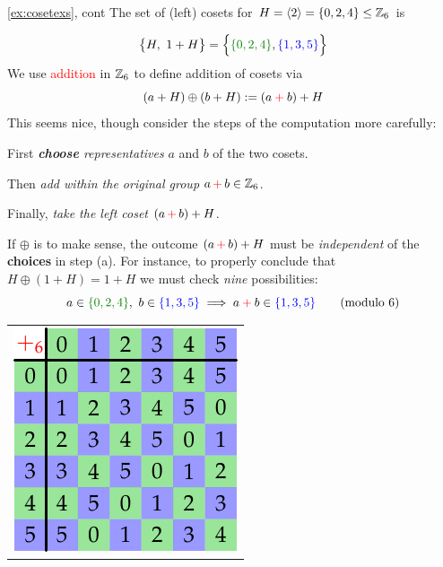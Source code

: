 \begin{examples*}{\ref{ex:cosetexs}, cont}{}
	\exstart The set of (left) cosets for $H=\left\langle 2\right\rangle=\{0,2,4\}\le\mathbb{Z}_6$ is
	\begin{enumerate}\setcounter{enumi}{1}
		\begin{minipage}[t]{0.7\linewidth}\vspace{-16pt}
		  \item[] 
			\[
				\bigl\{
					H,\ 1+H
				\bigr\}
				=\Bigl\{
					\textcolor{Green}{\{0,2,4\}}, \textcolor{blue}{\{1,3,5\}}
				\Bigr\}
			\]
			We use \textcolor{red}{addition} in $\mathbb{Z}_6$ to define addition of cosets via
			\[
				(a+H)\oplus(b+H):=(a\mathbin{\textcolor{red}{+}}b)+H
			\]
			This seems nice, though consider the steps of the computation more carefully:\vspace{-2pt}
		  \begin{enumeratea}\itemsep2pt
				\item First \emph{\textbf{choose} representatives} $a$ and $b$ of the two cosets.
				\item Then \emph{add within the original group} $a\operatorname{\textcolor{red}{+}}b\in\mathbb{Z}_6$.
				\item Finally, \emph{take the left coset} $(a\operatorname{\textcolor{red}{+}}b)+H$.
			\end{enumeratea}
			If $\oplus$ is to make sense, the outcome $(a\operatorname{\textcolor{red}{+}}b)+H$ must be \emph{independent} of the \textbf{choices} in step (a). For instance, to properly conclude that $H\oplus(1+H)=1+H$ we must check \emph{nine} possibilities:
			\[
				a\in \textcolor{Green}{\{0,2,4\}},\  b\in\textcolor{blue}{\{1,3,5\}} \implies a\mathbin{\textcolor{red}{+}} b\in\textcolor{blue}{\{1,3,5\}} \tag{modulo 6}
			\]
		\end{minipage}
		\hfill
		\begin{minipage}[t]{0.25\linewidth}\vspace{-2pt}
			\hfill
			\begin{tabular}{@{}c@{}}
				\includegraphics[scale=0.9]{factor-z6}\\

\end{tabular}
\end{minipage}
\end{enumerate}
\end{examples*}
